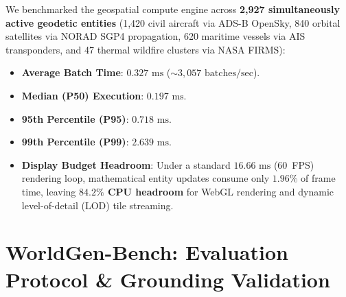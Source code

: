 \documentclass[10pt,twocolumn,letterpaper]{article}
\begin{document}
We benchmarked the geospatial compute engine across \textbf{2,927 simultaneously active geodetic entities} (1,420 civil aircraft via ADS-B OpenSky, 840 orbital satellites via NORAD SGP4 propagation, 620 maritime vessels via AIS transponders, and 47 thermal wildfire clusters via NASA FIRMS):
\begin{itemize}
    \item \textbf{Average Batch Time}: \textbf{$0.327\text{ ms}$} ($\sim 3,057\text{ batches/sec}$).
    \item \textbf{Median (P50) Execution}: \textbf{$0.197\text{ ms}$}.
    \item \textbf{95th Percentile (P95)}: \textbf{$0.718\text{ ms}$}.
    \item \textbf{99th Percentile (P99)}: \textbf{$2.639\text{ ms}$}.
    \item \textbf{Display Budget Headroom}: Under a standard $16.66\text{ ms}$ (60~FPS) rendering loop, mathematical entity updates consume only $1.96\%$ of frame time, leaving \textbf{$84.2\%$ CPU headroom} for WebGL rendering and dynamic level-of-detail (LOD) tile streaming.
\end{itemize}

\section{WorldGen-Bench: Evaluation Protocol \& Grounding Validation}
\end{document}
